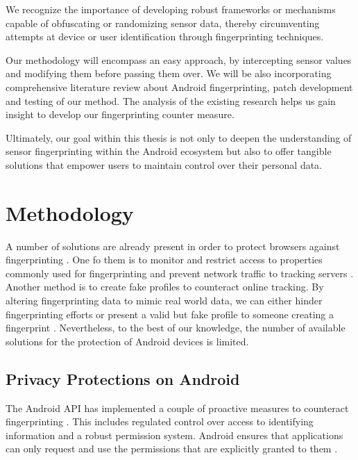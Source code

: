 \documentclass[11pt,
  oneside,openany,    %
]{scrreprt}
\begin{document}
We recognize the importance of developing robust frameworks or mechanisms capable of obfuscating or randomizing sensor data, thereby circumventing attempts at device or user identification through fingerprinting techniques. 

Our methodology will encompass an easy approach, by intercepting sensor values and modifying them before passing them over.
We will be also incorporating comprehensive literature review about Android fingerprinting, patch development and testing of our method.
The analysis of the existing research helps us gain insight to develop our fingerprinting counter measure.

Ultimately, our goal within this thesis is not only to deepen the understanding of sensor fingerprinting within the Android ecosystem but also to offer tangible solutions that empower users to maintain control over their personal data. 


\chapter{Methodology}
\label{chap:methodology}
A number of solutions are already present in order to protect browsers against fingerprinting \cite{DBLP:conf/secrypt/PolcakSMHM23, DBLP:conf/dbsec/FaizKhademiZW15, DBLP:conf/www/NikiforakisJL15, DBLP:conf/esorics/TorresJM15}. 
One fo them is to monitor and restrict access to properties commonly used for fingerprinting and prevent network traffic to tracking servers \cite{DBLP:conf/secrypt/PolcakSMHM23}. 
Another method is to create fake profiles to counteract online tracking. 
By altering fingerprinting data to mimic real world data, we can either hinder fingerprinting efforts or present a valid but fake profile to someone creating a fingerprint \cite{DBLP:conf/nbis/FioreCSP14}.
Nevertheless, to the best of our knowledge, the number of available solutions for the protection of Android devices is limited.

\section{Privacy Protections on Android}
\label{par:privacy-protections}
The Android API has implemented a couple of proactive measures to counteract fingerprinting \cite{android_privacy_10}.
This includes regulated control over access to identifying information and a robust permission system. 
Android ensures that applications can only request and use the permissions that are explicitly granted to them \cite{android_privacy_11}.
\end{document}
